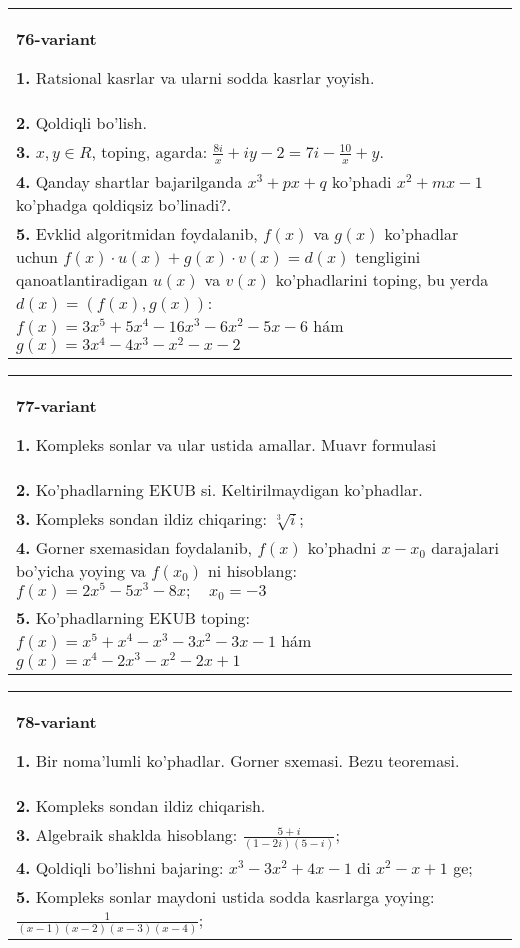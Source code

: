 \documentclass{article}
\begin{document}
\begin{tabular}{m{17cm}}
\textbf{76-variant}
\newline

\textbf{1.} Ratsional kasrlar va ularni sodda kasrlar yoyish. \\
\textbf{2.} Qoldiqli bo’lish.  \\
\textbf{3.} $x, y \in R$, toping, agarda:  $\frac{8 i}{x}+i y-2=7 i-\frac{10}{x}+y$. \\
\textbf{4.} Qanday shartlar bajarilganda $x^3+p x+q$ ko’phadi $x^2+m x-1$ ko’phadga qoldiqsiz bo’linadi?. \\
\textbf{5.} Evklid algoritmidan foydalanib, $f(x)$ va $g(x)$ ko’phadlar uchun $f(x) \cdot u(x)+g(x) \cdot v(x)=d(x)$ tengligini qanoatlantiradigan $u(x)$ va $v(x)$ ko’phadlarini toping, bu yerda $d(x)=(f(x), g(x))$:  $f(x)=3 x^5+5 x^4-16 x^3-6 x^2-5 x-6$ hám $g(x)=3 x^4-4 x^3-x^2-x-2$ \\

\end{tabular}
\vspace{1cm}


\begin{tabular}{m{17cm}}
\textbf{77-variant}
\newline

\textbf{1.} Kompleks sonlar va ular ustida amallar. Muavr formulasi  \\
\textbf{2.} Ko’phadlarning EKUB si. Keltirilmaydigan ko’phadlar. \\
\textbf{3.} Kompleks sondan ildiz chiqaring:  $\sqrt[3]{i}$; \\
\textbf{4.} Gorner sxemasidan foydalanib, $f(x)$ ko’phadni $x-x_0$ darajalari bo’yicha yoying va $f\left(x_0\right)$ ni hisoblang: $f(x)=2 x^5-5 x^3-8 x ; \quad x_0=-3$ \\
\textbf{5.} Ko’phadlarning EKUB toping: $f(x)=x^5+x^4-x^3-3 x^2-3 x-1$ hám $g(x)=x^4-2 x^3-x^2-2 x+1$ \\

\end{tabular}
\vspace{1cm}


\begin{tabular}{m{17cm}}
\textbf{78-variant}
\newline

\textbf{1.} Bir noma’lumli ko’phadlar. Gorner sxemasi. Bezu teoremasi.  \\
\textbf{2.} Kompleks sondan ildiz chiqarish. \\
\textbf{3.} Algebraik shaklda hisoblang: $\frac{5+i}{(1-2 i)(5-i)}$; \\
\textbf{4.} Qoldiqli bo’lishni bajaring:  $x^3-3 x^2+4 x-1$ di $x^2-x+1$ ge; \\
\textbf{5.} Kompleks sonlar maydoni ustida sodda kasrlarga yoying:$\frac{1}{(x-1)(x-2)(x-3)(x-4)}$; \\

\end{tabular}
\vspace{1cm}
\end{document}
